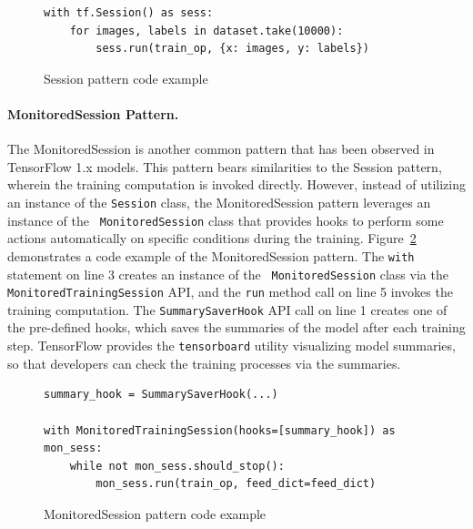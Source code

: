 \begin{figure}[!ht]
\begin{lstlisting}[style=mpython]
with tf.Session() as sess:
    for images, labels in dataset.take(10000):
        sess.run(train_op, {x: images, y: labels})
\end{lstlisting}
\caption{Session pattern code example}
\label{fig:sessionpattern}
\end{figure}




\paragraph{MonitoredSession Pattern.}
The MonitoredSession is another common pattern that has been observed in
TensorFlow 1.x models. 
This pattern bears similarities to the Session pattern, wherein the training
computation is invoked directly.
However, instead of utilizing an instance of the {\tt Session} class, the
MonitoredSession pattern leverages an instance of the {\tt
MonitoredSession} class that provides hooks to perform some actions
automatically on specific conditions during the training.
Figure~\ref{fig:monsesspattern} demonstrates a code example of the
MonitoredSession pattern.
The {\tt with} statement on line 3 creates an instance of the {\tt
MonitoredSession} class via the {\tt MonitoredTrainingSession} API, and the
{\tt run} method call on line 5 invokes the training computation.
The {\tt SummarySaverHook} API call on line 1 creates one of the pre-defined
hooks, which saves the summaries of the model after each training step. 
TensorFlow provides the {\tt tensorboard} utility visualizing model summaries,
so that developers can check the training processes via the summaries.

\begin{figure}[!ht]
  \begin{lstlisting}[style=mpython]
summary_hook = SummarySaverHook(...)

with MonitoredTrainingSession(hooks=[summary_hook]) as mon_sess:
    while not mon_sess.should_stop():
        mon_sess.run(train_op, feed_dict=feed_dict)\end{lstlisting}
  \caption{MonitoredSession pattern code example}
  \label{fig:monsesspattern}
\end{figure}

